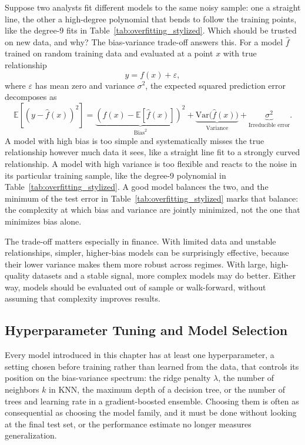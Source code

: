 \documentclass[../ai_in_finance]{subfiles}
\begin{document}
Suppose two analysts fit different models to the same noisy sample: one a straight line, the other a high-degree polynomial that bends to follow the training points, like the degree-9 fits in Table~\ref{tab:overfitting_stylized}. Which should be trusted on new data, and why? The bias-variance trade-off answers this. For a model $\hat f$ trained on random training data and evaluated at a point $x$ with true relationship
$$y = f(x) + \varepsilon,$$
where $\varepsilon$ has mean zero and variance $\sigma^2$, the expected squared prediction error decomposes as
\begin{equation}
\label{eq:ml-bias-variance}
\mathbb{E}\left[(y - \hat f(x))^2\right] = \underbrace{\left(f(x) - \mathbb{E}[\hat f(x)]\right)^2}_{\text{Bias}^2} + \underbrace{\text{Var}\big(\hat f(x)\big)}_{\text{Variance}} + \underbrace{\sigma^2}_{\text{Irreducible error}}.
\end{equation}
A model with high bias is too simple and systematically misses the true relationship however much data it sees, like a straight line fit to a strongly curved relationship. A model with high variance is too flexible and reacts to the noise in its particular training sample, like the degree-9 polynomial in Table~\ref{tab:overfitting_stylized}. A good model balances the two, and the minimum of the test error in Table~\ref{tab:overfitting_stylized} marks that balance: the complexity at which bias and variance are jointly minimized, not the one that minimizes bias alone.

The trade-off matters especially in finance. With limited data and unstable relationships, simpler, higher-bias models can be surprisingly effective, because their lower variance makes them more robust across regimes. With large, high-quality datasets and a stable signal, more complex models may do better. Either way, models should be evaluated out of sample or walk-forward, without assuming that complexity improves results.

\subsection{Hyperparameter Tuning and Model Selection}
\label{sec:hyperparameter-tuning}

Every model introduced in this chapter has at least one hyperparameter, a setting chosen before training rather than learned from the data, that controls its position on the bias-variance spectrum: the ridge penalty $\lambda$, the number of neighbors $k$ in KNN, the maximum depth of a decision tree, or the number of trees and learning rate in a gradient-boosted ensemble. Choosing them is often as consequential as choosing the model family, and it must be done without looking at the final test set, or the performance estimate no longer measures generalization.
\end{document}
